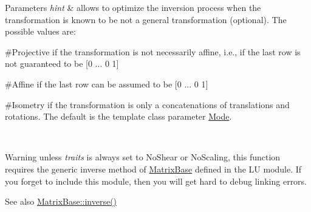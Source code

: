 \begin{DoxyParams}{Parameters}
{\em hint} & allows to optimize the inversion process when the transformation is known to be not a general transformation (optional). The possible values are\+:
\begin{DoxyItemize}
\item \#\+Projective if the transformation is not necessarily affine, i.\+e., if the last row is not guaranteed to be \mbox{[}0 ... 0 1\mbox{]}
\item \#\+Affine if the last row can be assumed to be \mbox{[}0 ... 0 1\mbox{]}
\item \#\+Isometry if the transformation is only a concatenations of translations and rotations. The default is the template class parameter {\ttfamily \mbox{\hyperlink{struct_mode}{Mode}}}.
\end{DoxyItemize}\\
\hline
\end{DoxyParams}
\begin{DoxyWarning}{Warning}
unless {\itshape traits} is always set to No\+Shear or No\+Scaling, this function requires the generic inverse method of \mbox{\hyperlink{class_eigen_1_1_matrix_base}{Matrix\+Base}} defined in the LU module. If you forget to include this module, then you will get hard to debug linking errors.
\end{DoxyWarning}
\begin{DoxySeeAlso}{See also}
\mbox{\hyperlink{class_eigen_1_1_matrix_base_a7712eb69e8ea3c8f7b8da1c44dbdeebf}{Matrix\+Base\+::inverse()}} 
\end{DoxySeeAlso}
\mbox{\label{class_eigen_1_1_transform_aa8aabb371eb391a0d1fa0134b34ae376}} 
